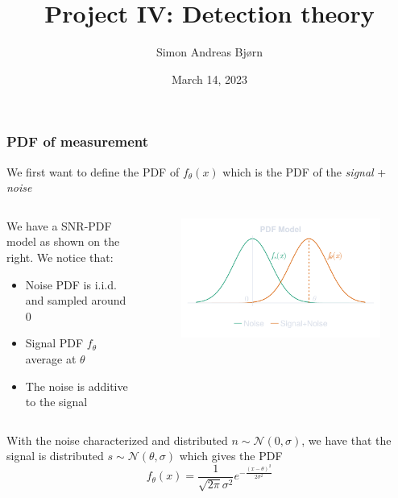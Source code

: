 \documentclass[compress,aspectratio=169]{beamer}
\title{Project IV: Detection theory}
\subtitle{}
\author{\Large Simon Andreas Bjørn}
\date{\large March 14, 2023}
\begin{document}
\begin{frame}
    \maketitle
\end{frame}

\begin{frame} %
    \frametitle{PDF of measurement}
    We first want to define the PDF of $f_\theta\left(x\right)$ which is the
    PDF of the {\em signal} + {\em noise}
    \begin{columns}
        \begin{column}{0.5\textwidth}
            We have a SNR-PDF model as shown on the right.
            We notice that:
            \begin{itemize}
                \item Noise PDF is i.i.d. and sampled around 0
                \item Signal PDF $f_\theta$ average at $\theta$
                \item The noise is additive to the signal
            \end{itemize}
        \end{column}
        \begin{column}{0.5\textwidth}
            \begin{figure}
                \includegraphics[width=\columnwidth]{"../PDFs.pdf"}
            \end{figure}
        \end{column}
    \end{columns}
    With the noise characterized and distributed $n \sim \mathcal{N}\left(0,\sigma\right)$, we have that
    the signal is distributed $s \sim \mathcal{N}\left(\theta,\sigma\right)$
    which gives the PDF
    \begin{equation*}
        f_\theta (x) = \frac{1}{\sqrt{2\pi}\sigma^2}e^{-\frac{\left(x-\theta\right)^2}{2\sigma^2}}
    \end{equation*}
\end{frame} %
\end{document}
